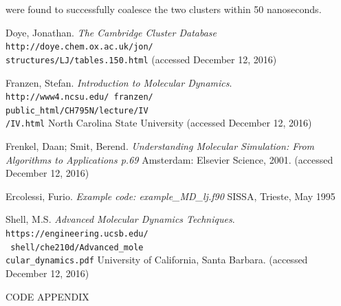 \documentclass{article}
\begin{document}
were found to successfully coalesce the two clusters within 50 nanoseconds.

\vspace{10cm}
\center
\begin{thebibliography}{9}
Doye, Jonathan.
\textit{The Cambridge Cluster Database}
\\\texttt{http://doye.chem.ox.ac.uk/jon/}
\\\texttt{structures/LJ/tables.150.html}
(accessed December 12, 2016)

Franzen, Stefan. 
\textit{Introduction to Molecular Dynamics}. 
\\\texttt{http://www4.ncsu.edu/~franzen/}
\\\texttt{public\_html/CH795N/lecture/IV}
\\\texttt{/IV.html}
North Carolina State University (accessed December 12, 2016)
 
Frenkel, Daan; Smit, Berend. 
\textit{Understanding Molecular Simulation: From Algorithms to Applications p.69}
Amsterdam: Elsevier Science, 2001. (accessed December 12, 2016)
 
Ercolessi, Furio.
\textit{Example code: example\_MD\_lj.f90}
SISSA, Trieste, May 1995

Shell, M.S. 
\textit{Advanced Molecular Dynamics Techniques}. 
\\\texttt{https://engineering.ucsb.edu/}
\\\texttt{~shell/che210d/Advanced\_mole}
\\\texttt{cular\_dynamics.pdf}
University of California, Santa Barbara. (accessed December 12, 2016)

\end{thebibliography}
\newpage
\onecolumn
CODE APPENDIX

\end{document}
